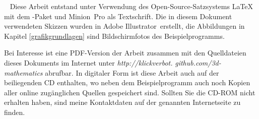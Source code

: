 \thispagestyle{plain}
\clearpage
~\vfill
\scriptsize
Diese Arbeit entstand unter Verwendung des Open-Source-Satzsystems \LaTeX{} mit dem \KOMAScript-Paket und Minion~Pro als Textschrift.
Die in diesem Dokument verwendeten Skizzen wurden in Adobe Illustrator\textregistered\ erstellt, die Abbildungen in Kapitel \ref{grafikgrundlagen} sind Bildschirmfotos des Beispielprogramms.

Bei Interesse ist eine PDF-Version der Arbeit zusammen mit den Quelldateien dieses Dokuments im Internet unter \emph{http://klickverbot.} \emph{github.com/3d-mathematics} 
abrufbar. In digitaler Form ist diese Arbeit auch auf der beiliegenden CD enthalten, wo neben dem Beispielprogramm auch noch Kopien aller online zugänglichen Quellen gespeichert sind. Sollten Sie die CD-ROM nicht erhalten haben, sind meine Kontaktdaten auf der genannten Internetseite zu finden.